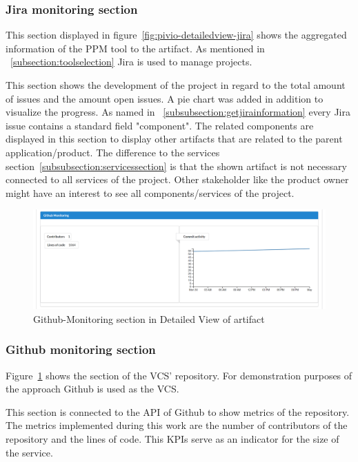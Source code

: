 \subsubsection{Jira monitoring section}

This section displayed in figure~\ref{fig:pivio-detailedview-jira} shows the aggregated information of the PPM tool to the artifact. As mentioned in ~\ref{subsection:toolselection} Jira is used to manage projects. 

This section shows the development of the project in regard to the total amount of issues and the amount open issues. A pie chart was added in addition to visualize the progress. As named in ~\ref{subsubsection:getjirainformation} every Jira issue contains a standard field "component". The related components are displayed in this section to display other artifacts that are related to the parent application/product. The difference to the services section~\ref{subsubsection:servicessection} is that the shown artifact is not necessary connected to all services of the project. Other stakeholder like the product owner might have an interest to see all components/services of the project.

\begin{figure}[htpb]
  \centering
  \includegraphics[width=1.0\textwidth]{figures/pivio-detailview-github.png} \caption{Github-Monitoring section in Detailed View of artifact}
  \label{fig:pivio-detailedview-github}
\end{figure}
\subsubsection{Github monitoring section}

Figure~\ref{fig:pivio-detailedview-github} shows the section of the VCS' repository. For demonstration purposes of the approach Github is used as the VCS.

This section is connected to the API of Github to show metrics of the repository. The metrics implemented during this work are the number of contributors of the repository and the lines of code. This KPIs serve as an indicator for the size of the service.

